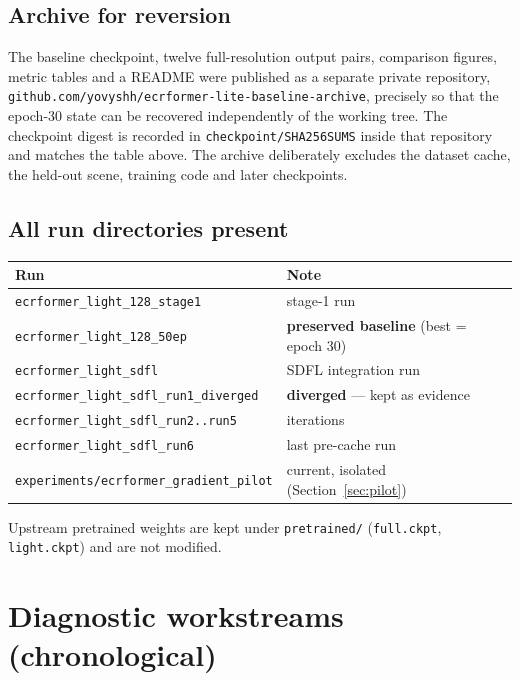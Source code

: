 \documentclass[10pt,a4paper]{article}
\newcommand{\code}[1]{\texttt{#1}}
\begin{document}
\subsection{Archive for reversion}

The baseline checkpoint, twelve full-resolution output pairs, comparison figures, metric tables
and a README were published as a separate private repository,
\code{github.com/yovyshh/ecrformer-lite-baseline-archive}, precisely so that the epoch-30 state can
be recovered independently of the working tree. The checkpoint digest is recorded in
\code{checkpoint/SHA256SUMS} inside that repository and matches the table above. The archive
deliberately excludes the dataset cache, the held-out scene, training code and later checkpoints.

\subsection{All run directories present}

\begin{center}
\begin{tabular}{@{}ll@{}}
\hline
Run & Note \\
\hline
\code{ecrformer\_light\_128\_stage1} & stage-1 run \\
\code{ecrformer\_light\_128\_50ep} & \textbf{preserved baseline} (best = epoch 30) \\
\code{ecrformer\_light\_sdfl} & SDFL integration run \\
\code{ecrformer\_light\_sdfl\_run1\_diverged} & \textbf{diverged} --- kept as evidence \\
\code{ecrformer\_light\_sdfl\_run2..run5} & iterations \\
\code{ecrformer\_light\_sdfl\_run6} & last pre-cache run \\
\code{experiments/ecrformer\_gradient\_pilot} & current, isolated (Section~\ref{sec:pilot}) \\
\hline
\end{tabular}
\end{center}

Upstream pretrained weights are kept under \code{pretrained/} (\code{full.ckpt},
\code{light.ckpt}) and are not modified.

\section{Diagnostic workstreams (chronological)}
\end{document}
